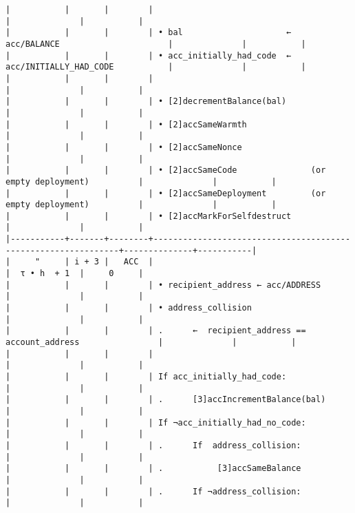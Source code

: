 \documentclass[varwidth=\maxdimen,margin=0.5cm,multi={verbatim}]{standalone}
\begin{document}
\begin{verbatim}
|           |       |        |                                                               |              |           |
|           |       |        | • bal                     ←  acc/BALANCE                      |              |           |
|           |       |        | • acc_initially_had_code  ←  acc/INITIALLY_HAD_CODE           |              |           |
|           |       |        |                                                               |              |           |
|           |       |        | • [2]decrementBalance(bal)                                    |              |           |
|           |       |        | • [2]accSameWarmth                                            |              |           |
|           |       |        | • [2]accSameNonce                                             |              |           |
|           |       |        | • [2]accSameCode               (or empty deployment)          |              |           |
|           |       |        | • [2]accSameDeployment         (or empty deployment)          |              |           |
|           |       |        | • [2]accMarkForSelfdestruct                                   |              |           |
|-----------+-------+--------+---------------------------------------------------------------+--------------+-----------|
|     "     | i + 3 |   ACC  |                                                               |  τ • h  + 1  |     0     |
|           |       |        | • recipient_address ← acc/ADDRESS                             |              |           |
|           |       |        | • address_collision                                           |              |           |
|           |       |        | .      ←  recipient_address == account_address                |              |           |
|           |       |        |                                                               |              |           |
|           |       |        | If acc_initially_had_code:                                    |              |           |
|           |       |        | .      [3]accIncrementBalance(bal)                            |              |           |
|           |       |        | If ¬acc_initially_had_no_code:                                |              |           |
|           |       |        | .      If  address_collision:                                 |              |           |
|           |       |        | .           [3]accSameBalance                                 |              |           |
|           |       |        | .      If ¬address_collision:                                 |              |           |

\end{verbatim}
\end{document}
